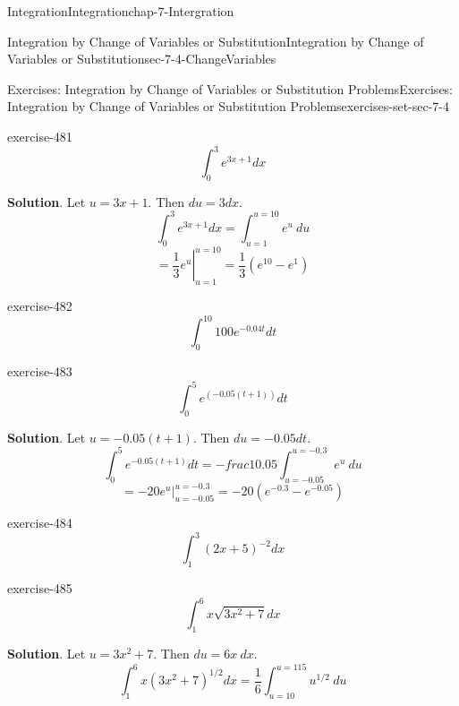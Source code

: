 \documentclass[oneside,10pt,]{book}
\numberwithin{equation}{section}
\begin{document}
\begin{chapterptx}{Integration}{}{Integration}{}{}{chap-7-Intergration}
\begin{sectionptx}{Integration by Change of Variables or Substitution}{}{Integration by Change of Variables or Substitution}{}{}{sec-7-4-ChangeVariables}
\begin{exercises-subsection-numberless}{Exercises: Integration by Change of Variables or Substitution Problems}{}{Exercises: Integration by Change of Variables or Substitution Problems}{}{}{exercises-set-sec-7-4}
\begin{divisionexercise}{13}{}{}{exercise-481}
\begin{equation*}
\int_0^3 e^{3x+1} dx
\end{equation*}
\par\smallskip%
\noindent\textbf{Solution}.\hypertarget{solution-244}{}\quad%
\hypertarget{p-2862}{}%
Let \(u=3x+1\).  Then \(du=3dx\).%
%
\begin{equation*}
\int_0^3 e^{3x+1} dx=\int_{u=1}^{u=10} e^u \ du
\end{equation*}
%
\begin{equation*}
=\left.\frac{1}{3}e^u\right|_{u=1}^{u=10}
=\frac{1}{3} (e^{10}-e^1)
\end{equation*}
\end{divisionexercise}%
\begin{divisionexercise}{14}{}{}{exercise-482}%
%
\begin{equation*}
\int_0^10 100e^{-0.04t} dt 
\end{equation*}
\end{divisionexercise}%
\begin{divisionexercise}{15}{}{}{exercise-483}%
%
\begin{equation*}
\int_0^5 e^{(-0.05(t+1))} dt 
\end{equation*}
\par\smallskip%
\noindent\textbf{Solution}.\hypertarget{solution-245}{}\quad%
\hypertarget{p-2863}{}%
Let \(u=-0.05(t+1)\).  Then \(du=-0.05dt\).%
%
\begin{equation*}
\int_0^5 e^{-0.05(t+1)} dt=-frac{1}{0.05}\int_{u=-0.05}^{u=-0.3} e^u \ du
\end{equation*}
%
\begin{equation*}
=\left.-20e^u\right|_{u=-0.05}^{u=-0.3}
=-20 (e^{-0.3}-e^{-0.05})
\end{equation*}
\end{divisionexercise}%
\begin{divisionexercise}{16}{}{}{exercise-484}%
%
\begin{equation*}
\int_1^3 (2x+5)^{-2} dx
\end{equation*}
\end{divisionexercise}%
\begin{divisionexercise}{17}{}{}{exercise-485}%
%
\begin{equation*}
\int_1^6 x\sqrt{3x^2+7} dx 
\end{equation*}
\par\smallskip%
\noindent\textbf{Solution}.\hypertarget{solution-246}{}\quad%
\hypertarget{p-2864}{}%
Let \(u=3x^2+7\).  Then \(du=6x\ dx\).%
%
\begin{equation*}
\int_1^6 x(3x^2+7)^{1/2} dx=\frac{1}{6}\int_{u=10}^{u=115} u^{1/2} \ du

\end{equation*}
\end{divisionexercise}
\end{exercises-subsection-numberless}
\end{sectionptx}
\end{chapterptx}
\end{document}
